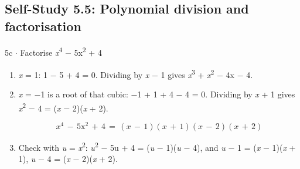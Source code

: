 \documentclass[11pt]{article}
\begin{document}
\begin{keepsection}\subsection{Self-Study 5.5: Polynomial division and factorisation}

\begin{workedbox}{5c \ensuremath{\cdot} Factorise \textit{x}\textsuperscript{4} \ensuremath{-} 5x\textsuperscript{2} + 4}
\begin{enumerate}
\item \textit{x} = 1: 1 \ensuremath{-} 5 + 4 = 0. Dividing by \textit{x} \ensuremath{-} 1 gives \textit{x}\textsuperscript{3} + \textit{x}\textsuperscript{2} \ensuremath{-} 4x \ensuremath{-} 4.
\item {}
\textit{x} = \ensuremath{-}1 is a root of that cubic: \ensuremath{-}1 + 1 + 4 \ensuremath{-} 4 = 0. Dividing by \textit{x} + 1 gives \textit{x}\textsuperscript{2} \ensuremath{-} 4 = (\textit{x} \ensuremath{-} 2)(\textit{x} + 2).

\begin{equation*}{x}^{4}\, -\, 5\mathrm{x}^{2}\, +\, 4\, =\, ({x}\, -\, 1)({x}\, +\, 1)({x}\, -\, 2)({x}\, +\, 2)\end{equation*}
\item Check with \textit{u} = \textit{x}\textsuperscript{2}: \textit{u}\textsuperscript{2} \ensuremath{-} 5u + 4 = (\textit{u} \ensuremath{-} 1)(\textit{u} \ensuremath{-} 4), and \textit{u} \ensuremath{-} 1 = (\textit{x} \ensuremath{-} 1)(\textit{x} + 1), \textit{u} \ensuremath{-} 4 = (\textit{x} \ensuremath{-} 2)(\textit{x} + 2).
\end{enumerate}
\end{workedbox}

\end{keepsection}
\end{document}
